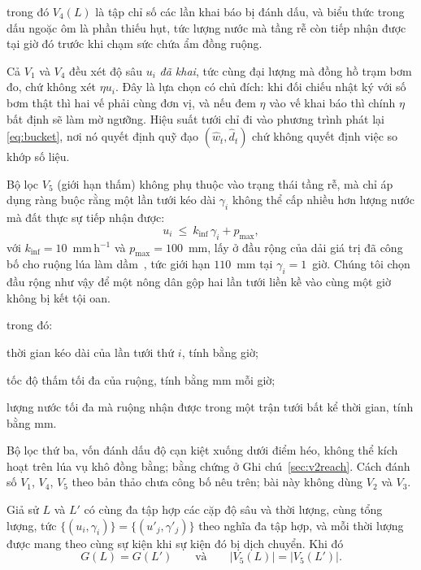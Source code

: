 trong đó $V_4(L)$ là tập chỉ số các lần khai báo bị đánh dấu, và biểu thức trong
dấu ngoặc ôm là phần thiếu hụt, tức lượng nước mà tầng rễ còn tiếp nhận được tại
giờ đó trước khi chạm sức chứa ẩm đồng ruộng.

Cả $V_1$ và $V_4$ đều xét độ sâu $u_i$ \emph{đã khai}, tức cùng đại lượng mà đồng hồ
trạm bơm đo, chứ không xét $\eta u_i$. Đây là lựa chọn có chủ đích: khi đối chiếu
nhật ký với số bơm thật thì hai vế phải cùng đơn vị, và nếu đem $\eta$ vào vế khai
báo thì chính $\eta$ bất định sẽ làm mờ ngưỡng. Hiệu suất tưới chỉ đi vào phương
trình phát lại \eqref{eq:bucket}, nơi nó quyết định quỹ đạo $(\hat w_t,\hat d_t)$
chứ không quyết định việc so khớp số liệu.

Bộ lọc \emph{$V_5$} (giới hạn thấm) không phụ thuộc vào trạng thái tầng rễ, mà
chỉ áp dụng ràng buộc rằng một lần tưới kéo dài $\gamma_i$ không thể cấp nhiều hơn
lượng nước mà đất thực sự tiếp nhận được:
\begin{equation}
u_i\ \le\ k_{\mathrm{inf}}\,\gamma_i+p_{\max},
\label{eq:v5}
\end{equation}
với $k_{\mathrm{inf}}=10$~mm\,h$^{-1}$ và $p_{\max}=100$~mm, lấy ở đầu rộng của dải giá
trị đã công bố cho ruộng lúa làm dầm~\cite{kukal2004,bouman2001}, tức giới hạn
$110$~mm tại $\gamma_i=1$~giờ. Chúng tôi chọn đầu rộng như vậy để một nông dân gộp
hai lần tưới liền kề vào cùng một giờ không bị kết tội oan.


trong đó:
\begin{symbolist}
\item[$\gamma_i$] thời gian kéo dài của lần tưới thứ $i$, tính bằng giờ;
\item[$k_{\mathrm{inf}}$] tốc độ thấm tối đa của ruộng, tính bằng mm mỗi giờ;
\item[$p_{\max}$] lượng nước tối đa mà ruộng nhận được trong một trận tưới bất
    kể thời gian, tính bằng mm.
\end{symbolist}

Bộ lọc thứ ba, vốn đánh dấu độ cạn kiệt xuống dưới điểm héo, không thể kích hoạt
trên lúa vụ khô đồng bằng; bằng chứng ở Ghi chú~\ref{sec:v2reach}. Cách đánh số $V_1$, $V_4$, $V_5$ theo bản thảo chưa công bố nêu trên; bài này không dùng $V_2$ và $V_3$.

\begin{proposition}
\label{prop:blind}
Giả sử $L$ và $L'$ có cùng đa tập hợp các cặp độ sâu và thời lượng, cùng tổng
lượng, tức $\{(u_i,\gamma_i)\}=\{(u'_j,\gamma'_j)\}$ theo nghĩa đa tập hợp, và mỗi
thời lượng được mang theo cùng sự kiện khi sự kiện đó bị dịch chuyển. Khi đó
\begin{equation}
G(L)=G(L')\qquad\text{và}\qquad |V_5(L)|=|V_5(L')|.
\end{equation}
\end{proposition}

